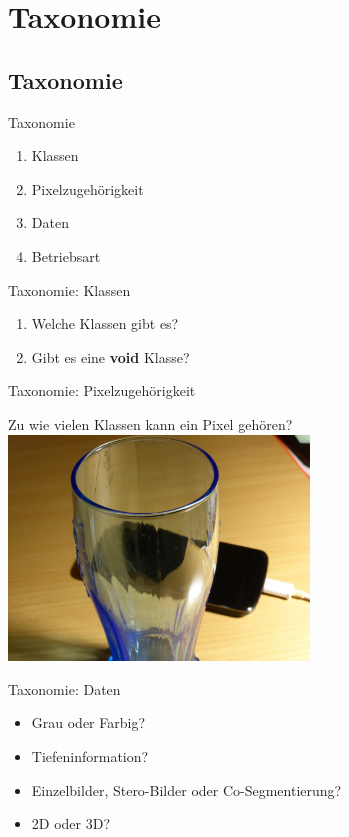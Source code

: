 \section{Taxonomie}
\subsection{Taxonomie}

\begin{frame}{Taxonomie}
    \begin{enumerate}
        \item Klassen
        \item Pixelzugehörigkeit
        \item Daten
        \item Betriebsart
    \end{enumerate}
\end{frame}

\begin{frame}{Taxonomie: Klassen}
    \begin{enumerate}
        \item Welche Klassen gibt es?
        \item Gibt es eine \textbf{void} Klasse?
    \end{enumerate}
\end{frame}

\begin{frame}{Taxonomie: Pixelzugehörigkeit}
    \begin{center}
        Zu wie vielen Klassen kann ein Pixel gehören?\\

        \includegraphics[width=0.6\textwidth]{../images/glass-smartphone-table-2.jpg}
    \end{center}
\end{frame}

\begin{frame}{Taxonomie: Daten}
    \begin{itemize}
        \item Grau oder Farbig?
        \item Tiefeninformation?
        \item Einzelbilder, Stero-Bilder oder Co-Segmentierung?
        \item 2D oder 3D?
    \end{itemize}
\end{frame}

